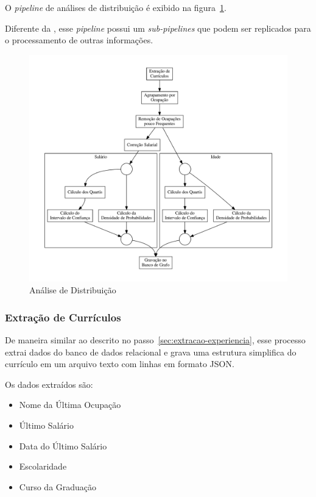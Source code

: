 \documentclass[12pt,a4paper]{article}
\begin{document}
O \textit{pipeline} de análises de distribuição é exibido na figura~\ref{fig:analise-de-distribuicao}.

Diferente da , esse \textit{pipeline} possui um \textit{sub-pipelines} que podem ser replicados para o processamento de outras informações.

\begin{figure}[ht]
  \centering
  \includegraphics[scale=0.4]{pipeline2.pdf}
  \caption{Análise de Distribuição}
  \label{fig:analise-de-distribuicao}
\end{figure}

\subsubsection{Extração de Currículos}

De maneira similar ao descrito no passo~\ref{sec:extracao-experiencia}, esse processo extrai dados do banco de dados relacional e grava uma estrutura simplifica do currículo em um arquivo texto com linhas em formato JSON.

Os dados extraídos são:

\begin{itemize}
\item Nome da Última Ocupação
\item Último Salário
\item Data do Último Salário
\item Escolaridade
\item Curso da Graduação
\end{itemize}
\end{document}
